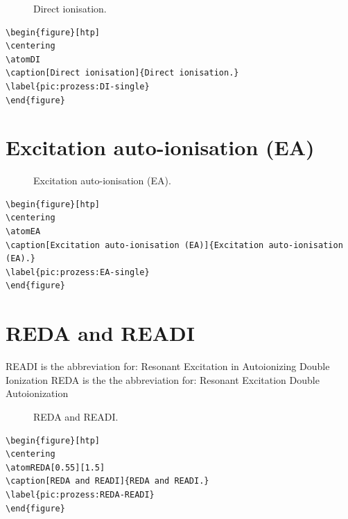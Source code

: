 \documentclass[
	a4paper,
	parskip=half,
    pagesize=auto,      		%
    listof=totoc,   		%
    bibliography=totoc,
	11pt
]{scrartcl}
\begin{document}
\begin{figure}[htp]
\centering
\atomDI
\caption[Direct ionisation]{Direct ionisation.}
\label{pic:prozess:DI-single}
\end{figure}

\begin{lstlisting}
\begin{figure}[htp]
\centering
\atomDI
\caption[Direct ionisation]{Direct ionisation.}
\label{pic:prozess:DI-single}
\end{figure}
\end{lstlisting}






\section{Excitation auto-ionisation (EA)}

\begin{figure}[htp]
\centering
\atomEA
\caption[Excitation auto-ionisation (EA)]{Excitation auto-ionisation (EA).}
\label{pic:prozess:EA-single}
\end{figure}

\begin{lstlisting}
\begin{figure}[htp]
\centering
\atomEA
\caption[Excitation auto-ionisation (EA)]{Excitation auto-ionisation (EA).}
\label{pic:prozess:EA-single}
\end{figure}
\end{lstlisting}







\section{REDA and READI}

READI is the abbreviation for: Resonant Excitation in Autoionizing Double Ionization
REDA is the the abbreviation for: Resonant Excitation Double Autoionization

\begin{figure}[htp]
\centering
\atomREDA[0.55][1.5]
\caption[REDA and READI]{REDA and READI.}
\label{pic:prozess:REDA-READI}
\end{figure}

\begin{lstlisting}
\begin{figure}[htp]
\centering
\atomREDA[0.55][1.5]
\caption[REDA and READI]{REDA and READI.}
\label{pic:prozess:REDA-READI}
\end{figure}
\end{lstlisting}
\end{document}
